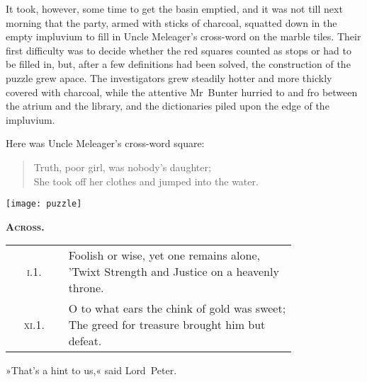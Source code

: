 It took, however, some time to get the basin emptied, and it was not till next morning that the party, armed with sticks of charcoal, squatted down in the empty impluvium to fill in Uncle Meleager's cross-word on the marble tiles. Their first difficulty was to decide whether the red squares counted as stops or had to be filled in, but, after a few definitions had been solved, the construction of the puzzle grew apace. The investigators grew steadily hotter and more thickly covered with charcoal, while the attentive Mr~Bunter hurried to and fro between the atrium and the library, and the dictionaries piled upon the edge of the impluvium.

\vfill

Here was Uncle Meleager's cross-word square:

\begin{quote}
Truth, poor girl, was nobody's daughter;\\
She took off her clothes and jumped into the water.\\
\end{quote}

\begin{center}
\texttt{[image: puzzle]}
\end{center}

\pagebreak[2]

{\scshape\large\bfseries Across.}

\def\arraystretch{2.5}
	
\begin{longtable} {c p{0.8\linewidth}} 
\textsc{i}.1. & \makecell[l]{Foolish or wise, yet one remains alone,\\'Twixt Strength and Justice on a heavenly throne.}\\
\textsc{xi}.1. & \makecell[l]{O to what ears the chink of gold was sweet;\\
The greed for treasure brought him but defeat.}\\
\end{longtable}

»That's a hint to us,« said Lord~Peter.

